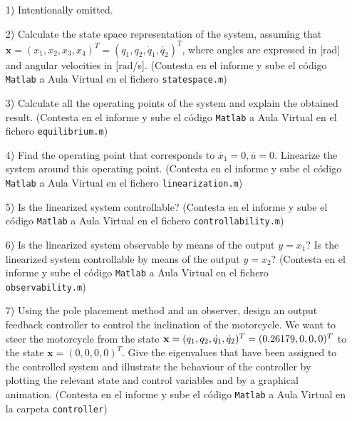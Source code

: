 \documentclass{article}
\begin{document}
\begin{itemize}
\item[1)] Intentionally omitted. 

\item[2)] Calculate the state space representation of the system, assuming that $\mathbf{x}  = ( x_1, x_2, x_3, x_4)^T = (q_1, q_2, \dot{q}_1, \dot{q_2})^T$, where angles are expressed in [rad] and angular velocities in [rad/s]. (Contesta en el informe y sube el c\'odigo \texttt{Matlab} a Aula Virtual en el fichero \texttt{statespace.m})

\item[3)] Calculate all the operating points of the system and explain the obtained result. (Contesta en el informe y sube el c\'odigo \texttt{Matlab} a Aula Virtual en el fichero \texttt{equilibrium.m})

\item[4)] Find the operating point that corresponds to $\overline{x}_1 = 0, \overline{u} = 0$. Linearize the system around this operating point.
(Contesta en el informe y sube el c\'odigo \texttt{Matlab} a Aula Virtual en el fichero \texttt{linearization.m})

\item[5)] 
Is the linearized system controllable? 
(Contesta en el informe y sube el c\'odigo \texttt{Matlab} a Aula Virtual en el fichero \texttt{controllability.m})

\item[6)] Is the linearized system observable by means of the output $y=x_1$? Is the linearized system controllable by means of the output $y = x_2$? (Contesta en el informe y sube el c\'odigo \texttt{Matlab} a Aula Virtual en el fichero \texttt{observability.m})


\item[7)] Using the pole placement method and an observer, design an output feedback controller to control the inclination of the motorcycle. 
We want to steer the motorcycle from the state $\mathbf{x} = (q_1, q_2, \dot{q}_1, \dot{q}_2)^T = (0.26179\if9387799149\fi,0,0,0)^T$ to the state $\mathbf{x} = (0, 0, 0, 0)^T$. 
Give the eigenvalues that have been assigned to the controlled system and illustrate the behaviour of the controller by plotting the relevant state and control variables and by a graphical animation. (Contesta en el informe y sube el c\'odigo \texttt{Matlab} a Aula Virtual en la carpeta \texttt{controller})


  

\end{itemize}
\end{document}
